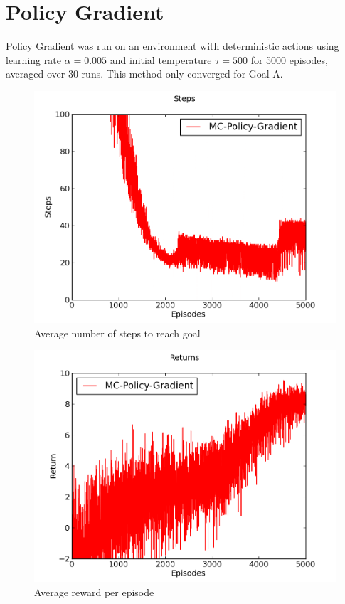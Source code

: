 \documentclass[a4paper]{article}
\begin{document}
\newpage

\section{Policy Gradient}

Policy Gradient was run on an environment with deterministic actions using 
learning rate $\alpha = 0.005$ and initial temperature $\tau = 500$ for 5000
episodes, averaged over 30 runs. This method only converged for Goal A.

\begin{figure}[htbp!]
\center
\includegraphics[scale=0.75]{A/pg-steps.png}
\caption{Average number of steps to reach goal}
\end{figure}

\begin{figure}[htbp!]
\center
\includegraphics[scale=0.75]{A/pg-returns.png}
\caption{Average reward per episode}
\end{figure}
\end{document}
